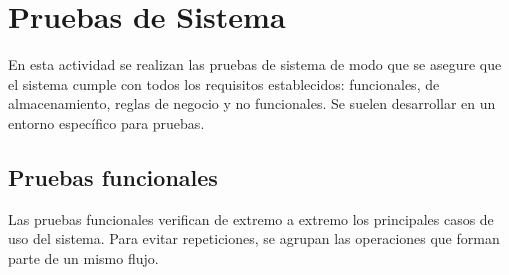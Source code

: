 \section{Pruebas de Sistema}
En esta actividad se realizan las pruebas de sistema de modo que se asegure que el sistema cumple con todos los requisitos establecidos: funcionales, de almacenamiento, reglas de negocio y no funcionales. Se suelen desarrollar en un entorno específico para pruebas.

\subsection{Pruebas funcionales}

Las pruebas funcionales verifican de extremo a extremo los principales casos de
uso del sistema. Para evitar repeticiones, se agrupan las operaciones que forman
parte de un mismo flujo.

